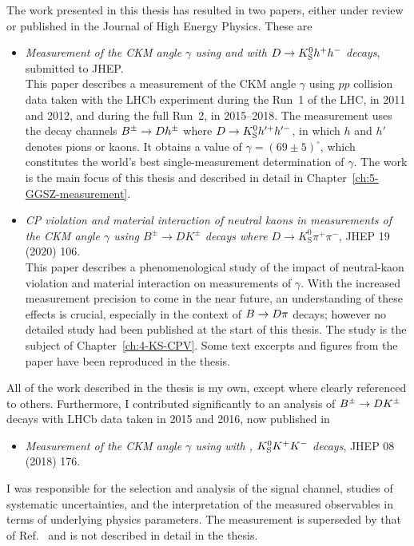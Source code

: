 The work presented in this thesis has resulted in two papers, either under review or published in the Journal of High Energy Physics. These are
\begin{itemize}

    \item [] \cite{GGSZ-B2Dh} \emph{Measurement of the CKM angle $\gamma$ using \BtoDK and \BtoDpi with ${D}\rightarrow{\ensuremath{{K}^0_{\mathrm{S}}}} h^+ h^-$ decays}, submitted to JHEP. \\
    This paper describes a measurement of the CKM angle $\gamma$ using $pp$ collision data taken with the LHCb experiment during the Run~1 of the LHC, in 2011 and 2012, and during the full Run~2, in 2015--2018. The measurement uses the decay channels ${{B}^\pm}\rightarrow{\ensuremath{D}} h^\pm$ where ${D}\rightarrow{\ensuremath{{K}^0_{\mathrm{S}}}} h'^+h'^-$, in which $h$ and $h'$ denotes pions or kaons. It obtains a value of $\gamma = (69\pm5)^\circ$, which constitutes the world's best single-measurement determination of $\gamma$. The work is the main focus of this thesis and described in detail in Chapter~\ref{ch:5-GGSZ-measurement}.

    \item [] \cite{KsCPV} \emph{CP violation and material interaction of neutral kaons
                        in measurements of the CKM angle $\gamma$ using $B^\pm\to
                        DK^\pm$ decays where $D\to K_\text{S}^0\pi^+\pi^-$}, JHEP 19 (2020) 106. \\
                        This paper describes a phenomenological study of the impact of neutral-kaon \CP violation and material interaction on measurements of $\gamma$. With the increased measurement precision to come in the near future, an understanding of these effects is crucial, especially in the context of ${B}\rightarrow{\ensuremath{D}}\pi$ decays; however no detailed study had been published at the start of this thesis. The study is the subject of Chapter~\ref{ch:4-KS-CPV}. Some text excerpts and figures from the paper have been reproduced in the thesis.
\end{itemize}
All of the work described in the thesis is my own, except where clearly referenced to others. Furthermore, I contributed significantly to an analysis of ${{B}^\pm}\rightarrow{\ensuremath{D}}{\ensuremath{{K}^\pm}}$ decays with LHCb data taken in 2015 and 2016, now published in
\begin{itemize}
    \item [] \cite{LHCb-PAPER-2018-017} \emph{Measurement of the CKM angle $\gamma$ using  with , ${{K}^0_{\mathrm{S}}} K^+K^-$ decays}, JHEP 08 (2018) 176.
\end{itemize}
I was responsible for the selection and analysis of the signal channel, studies of systematic uncertainties, and the interpretation of the measured observables in terms of underlying physics parameters. The measurement is superseded by that of Ref.~\cite{GGSZ-B2Dh} and is not described in detail in the thesis.

